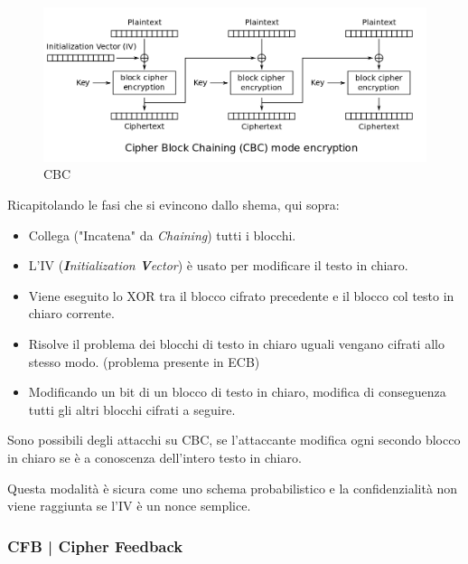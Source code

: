 \begin{figure}[H]
	\centering
	\includegraphics[width=1\textwidth, height=1\textheight, keepaspectratio]{./images/aes_modes/cbc.png} %
	\caption{CBC}
	\label{fig:cbc}
\end{figure}

\textsf{\small Ricapitolando le fasi che si evincono dallo shema, qui sopra:}

\begin{itemize}
	\item \textsf{\small Collega ("Incatena" da \emph{Chaining}) tutti i blocchi.}
	\item \textsf{\small L'IV (\emph{\textbf{I}nitialization \textbf{V}ector}) è usato per modificare il testo in chiaro.}
	\item \textsf{\small Viene eseguito lo XOR tra il blocco cifrato precedente e il blocco col testo in chiaro corrente.}
	\item \textsf{\small Risolve il problema dei blocchi di testo in chiaro uguali vengano cifrati allo stesso modo. (problema presente in ECB)}
	\item \textsf{\small Modificando un bit di un blocco di testo in chiaro, modifica di conseguenza tutti gli altri blocchi cifrati a seguire.}
\end{itemize}


\textsf{\small Sono possibili degli attacchi su CBC, se l'attaccante modifica ogni secondo blocco in chiaro se è a conoscenza dell'intero testo in chiaro.}

\textsf{\small Questa modalità è sicura come uno schema probabilistico e la confidenzialità non viene raggiunta se l'IV è un nonce semplice.} %

\subsubsection{CFB | Cipher Feedback}

